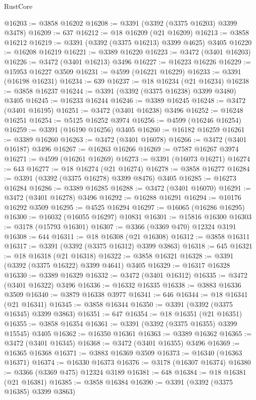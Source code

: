 \begin{lexlean}{RustCore}
\begin{coremodule}
@16203 := @3858 @16202
@16208 := @3391 (@3392 (@3375 @16203) @3399 @3478)
@16209 := 637
@16212 := @18 @16209 (@21 @16209)
@16213 := @3858 @16212
@16219 := @3391 (@3392 (@3375 @16213) @3399 @4625) @3405
@16220 := @16208 @16219
@16221 := @3389 @16220
@16223 := @3472 (@3401 @16203)
@16226 := @3472 (@3401 @16213) @3496
@16227 := @16223 @16226
@16229 := @15953 @16227 @3509
@16231 := @4599 (@16221 @16229)
@16233 := @3391 (@16198 @16231)
@16234 := 639
@16237 := @18 @16234 (@21 @16234)
@16238 := @3858 @16237
@16244 := @3391 (@3392 (@3375 @16238) @3399 @3480) @3405
@16245 := @16233 @16244
@16246 := @3389 @16245
@16248 := @3472 (@3401 @16195)
@16251 := @3472 (@3401 @16238) @3496
@16252 := @16248 @16251
@16254 := @5125 @16252 @3974
@16256 := @4599 (@16246 @16254)
@16259 := @3391 (@16190 @16256) @3405
@16260 := @16182 @16259
@16261 := @3389 @16260
@16263 := @3472 (@3401 @16078)
@16266 := @3472 (@3401 @16187) @3496
@16267 := @16263 @16266
@16269 := @7587 @16267 @3974
@16271 := @4599 (@16261 @16269)
@16273 := @3391 (@16073 @16271)
@16274 := 643
@16277 := @18 @16274 (@21 @16274)
@16278 := @3858 @16277
@16284 := @3391 (@3392 (@3375 @16278) @3399 @8476) @3405
@16285 := @16273 @16284
@16286 := @3389 @16285
@16288 := @3472 (@3401 @16070)
@16291 := @3472 (@3401 @16278) @3496
@16292 := @16288 @16291
@16294 := @10176 @16292 @3509
@16295 := @4525 @16294
@16297 := @16065 (@16286 @16295)
@16300 := @16032 (@16055 @16297) @10831
@16301 := @15816 @16300
@16303 := @3178 (@15793 @16301)
@16307 := @3366 (@3369 @470) @12324 @3191
@16308 := 644
@16311 := @18 @16308 (@21 @16308)
@16312 := @3858 @16311
@16317 := @3391 (@3392 (@3375 @16312) @3399 @3863)
@16318 := 645
@16321 := @18 @16318 (@21 @16318)
@16322 := @3858 @16321
@16328 := @3391 (@3392 (@3375 @16322) @3399 @4641) @3405
@16329 := @16317 @16328
@16330 := @3389 @16329
@16332 := @3472 (@3401 @16312)
@16335 := @3472 (@3401 @16322) @3496
@16336 := @16332 @16335
@16338 := @3883 @16336 @3509
@16340 := @3879 @16338 @3977
@16341 := 646
@16344 := @18 @16341 (@21 @16341)
@16345 := @3858 @16344
@16350 := @3391 (@3392 (@3375 @16345) @3399 @3863)
@16351 := 647
@16354 := @18 @16351 (@21 @16351)
@16355 := @3858 @16354
@16361 := @3391 (@3392 (@3375 @16355) @3399 @15545) @3405
@16362 := @16350 @16361
@16363 := @3389 @16362
@16365 := @3472 (@3401 @16345)
@16368 := @3472 (@3401 @16355) @3496
@16369 := @16365 @16368
@16371 := @3883 @16369 @3509
@16373 := @16340 (@16363 @16371)
@16374 := @16330 @16373
@16376 := @3178 (@16307 @16374)
@16380 := @3366 (@3369 @475) @12324 @3189
@16381 := 648
@16384 := @18 @16381 (@21 @16381)
@16385 := @3858 @16384
@16390 := @3391 (@3392 (@3375 @16385) @3399 @3863)

\end{coremodule}
\end{lexlean}
